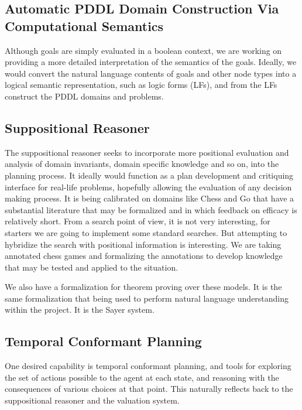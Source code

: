 \documentclass[letterpaper]{article}
\begin{document}
\subsection{Automatic PDDL Domain Construction Via Computational Semantics}

\noindent Although goals are simply evaluated in a boolean context, we
are working on providing a more detailed interpretation of the
semantics of the goals.  Ideally, we would convert the natural
language contents of goals and other node types into a logical
semantic representation, such as logic forms (LFs), and from the LFs
construct the PDDL domains and problems.

\subsection{Suppositional Reasoner}

\noindent The suppositional reasoner seeks to incorporate more
positional evaluation and analysis of domain invariants, domain
specific knowledge and so on, into the planning process.  It ideally
would function as a plan development and critiquing interface for
real-life problems, hopefully allowing the evaluation of any decision
making process.  It is being calibrated on domains like Chess and Go
that have a substantial literature that may be formalized and in which
feedback on efficacy is relatively short.  From a search point of
view, it is not very interesting, for starters we are going to
implement some standard searches.  But attempting to hybridize the
search with positional information is interesting.  We are taking
annotated chess games and formalizing the annotations to develop
knowledge that may be tested and applied to the situation.

We also have a formalization for theorem proving over these models.
It is the same formalization that being used to perform natural
language understanding within the project.  It is the Sayer system.

\subsection{Temporal Conformant Planning}

One desired capability is temporal conformant planning, and tools for
exploring the set of actions possible to the agent at each state, and
reasoning with the consequences of various choices at that point.
This naturally reflects back to the suppositional reasoner and the
valuation system.
\end{document}

